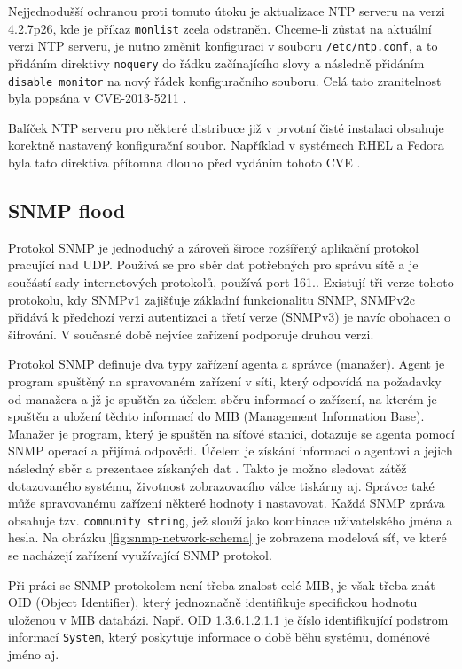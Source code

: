 Nejjednodušší ochranou proti tomuto útoku je aktualizace NTP serveru na verzi 4.2.7p26, kde
je příkaz \texttt{monlist} zcela odstraněn. Chceme-li zůstat na aktuální verzi NTP serveru,
je nutno změnit konfiguraci v souboru \texttt{/etc/ntp.conf}, a to přidáním direktivy
\texttt{noquery} do řádku začínajícího slovy  a následně přidáním
\texttt{disable monitor} na nový řádek konfiguračního souboru. 
Celá tato zranitelnost byla popsána v CVE-2013-5211 \cite{CVE-2013-5211}.

Balíček NTP serveru pro některé distribuce již v prvotní čisté instalaci obsahuje korektně
nastavený konfigurační soubor. Například v systémech RHEL a Fedora byla tato direktiva
přítomna dlouho před vydáním tohoto CVE \cite{RHBZ1047854}.

\subsection{SNMP flood}
\label{subsec:snmp_flood}
Protokol SNMP je jednoduchý a zároveň široce rozšířený aplikační protokol pracující nad UDP. Používá se pro sběr dat potřebných pro správu sítě a je součástí sady internetových protokolů, používá port 161.\cite{rfc1157}. Existují tři verze tohoto protokolu, kdy SNMPv1 zajišťuje základní funkcionalitu SNMP, SNMPv2c přidává k předchozí verzi autentizaci a třetí verze (SNMPv3) je navíc obohacen o šifrování. V současné době nejvíce zařízení podporuje druhou verzi.

Protokol SNMP definuje dva typy zařízení agenta a správce (manažer). Agent je program spuštěný na spravovaném zařízení v síti, který odpovídá na požadavky od manažera a jž je spuštěn za účelem sběru informací o zařízení, na kterém je spuštěn a uložení těchto informací do MIB (Management Information Base). Manažer je program, který je spuštěn na síťové stanici, dotazuje se agenta pomocí SNMP operací a přijímá odpovědi. Účelem je získání informací o agentovi a jejich následný sběr a prezentace získaných dat \cite{Skrivanek2006}. Takto je možno sledovat zátěž dotazovaného systému, životnost zobrazovacího válce tiskárny aj. Správce také může spravovanému zařízení některé hodnoty i nastavovat. Každá SNMP zpráva obsahuje tzv. \texttt{community string}, jež slouží jako kombinace uživatelského jména a hesla. Na obrázku \ref{fig:snmp-network-schema} je zobrazena modelová síť, ve které se nacházejí zařízení využívající SNMP protokol.

Při práci se SNMP protokolem není třeba znalost celé MIB, je však třeba znát OID (Object Identifier), který jednoznačně identifikuje specifickou hodnotu uloženou v MIB databázi. Např. OID 1.3.6.1.2.1.1 je číslo identifikující podstrom informací \texttt{System}, který poskytuje informace o době běhu systému, doménové jméno aj.

